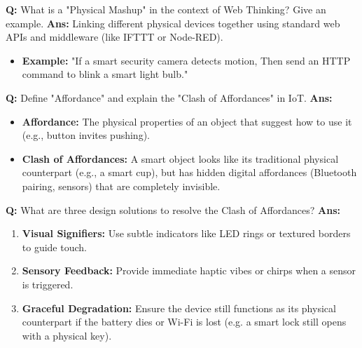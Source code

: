 \documentclass[10pt,a4paper,twocolumn]{article}
\begin{document}
\begin{tcolorbox}[
  colback=white,
  colframe=UnitColorTwo,
  colbacktitle=gray!10!white,
  coltitle=black,
  fonttitle=\bfseries\sffamily\small,
  title={Unit II $\bullet$ Card 12},
  boxrule=1.2pt,
  arc=2mm,
  outer arc=2mm,
  boxsep=1.5mm,
  top=1mm,
  bottom=1mm,
  left=1.5mm,
  right=1.5mm,
  before skip=2.5mm,
  after skip=2.5mm
]
\textbf{Q:} What is a "Physical Mashup" in the context of Web Thinking? Give an example.
\tcbline
\textbf{Ans:} Linking different physical devices together using standard web APIs and middleware (like IFTTT or Node-RED).  
\begin{itemize}
  \item   \textbf{Example:} "If a smart security camera detects motion, Then send an HTTP command to blink a smart light bulb."
\end{itemize}
\end{tcolorbox}


\begin{tcolorbox}[
  colback=white,
  colframe=UnitColorTwo,
  colbacktitle=gray!10!white,
  coltitle=black,
  fonttitle=\bfseries\sffamily\small,
  title={Unit II $\bullet$ Card 13},
  boxrule=1.2pt,
  arc=2mm,
  outer arc=2mm,
  boxsep=1.5mm,
  top=1mm,
  bottom=1mm,
  left=1.5mm,
  right=1.5mm,
  before skip=2.5mm,
  after skip=2.5mm
]
\textbf{Q:} Define "Affordance" and explain the "Clash of Affordances" in IoT.
\tcbline
\textbf{Ans:} \begin{itemize}
  \item   \textbf{Affordance:} The physical properties of an object that suggest how to use it (e.g., button invites pushing).
  \item   \textbf{Clash of Affordances:} A smart object looks like its traditional physical counterpart (e.g., a smart cup), but has hidden digital affordances (Bluetooth pairing, sensors) that are completely invisible.
\end{itemize}
\end{tcolorbox}


\begin{tcolorbox}[
  colback=white,
  colframe=UnitColorTwo,
  colbacktitle=gray!10!white,
  coltitle=black,
  fonttitle=\bfseries\sffamily\small,
  title={Unit II $\bullet$ Card 14},
  boxrule=1.2pt,
  arc=2mm,
  outer arc=2mm,
  boxsep=1.5mm,
  top=1mm,
  bottom=1mm,
  left=1.5mm,
  right=1.5mm,
  before skip=2.5mm,
  after skip=2.5mm
]
\textbf{Q:} What are three design solutions to resolve the Clash of Affordances?
\tcbline
\textbf{Ans:} \begin{enumerate}
  \item \textbf{Visual Signifiers:} Use subtle indicators like LED rings or textured borders to guide touch.
  \item \textbf{Sensory Feedback:} Provide immediate haptic vibes or chirps when a sensor is triggered.
  \item \textbf{Graceful Degradation:} Ensure the device still functions as its physical counterpart if the battery dies or Wi-Fi is lost (e.g. a smart lock still opens with a physical key).
\end{enumerate}
\end{tcolorbox}
\end{document}
